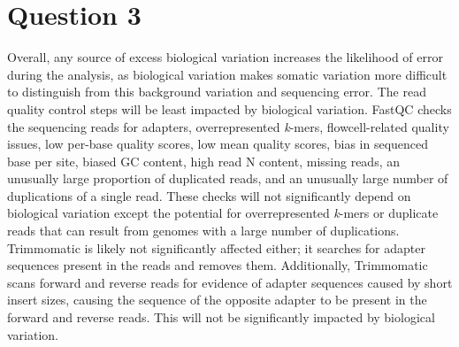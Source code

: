 \section{Question 3}




Overall, any source of excess biological variation increases the likelihood of error during the analysis, as biological variation makes somatic variation more difficult to distinguish from this background variation and sequencing error.
The read quality control steps will be least impacted by biological variation. FastQC checks the sequencing reads for adapters, overrepresented \textit{k}-mers, flowcell-related quality issues, low per-base quality scores, low mean quality scores, bias in sequenced base per site, biased GC content, high read N content, missing reads, an unusually large proportion of duplicated reads, and an unusually large number of duplications of a single read. These checks will not significantly depend on biological variation except the potential for overrepresented \textit{k}-mers or duplicate reads that can result from genomes with a large number of duplications. Trimmomatic is likely not significantly affected either; it searches for adapter sequences present in the reads and removes them. Additionally, Trimmomatic scans forward and reverse reads for evidence of adapter sequences caused by short insert sizes, causing the sequence of the opposite adapter to be present in the forward and reverse reads. This will not be significantly impacted by biological variation.


